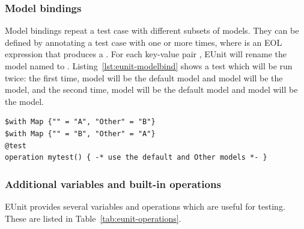 \subsubsection{Model bindings}

Model bindings repeat a test case with different subsets of models. They can be defined by annotating a test case with  one or more times, where  is an EOL expression that produces a . For each key-value pair , EUnit will rename the model named  to . Listing~\ref{lst:eunit-modelbind} shows a test which will be run twice: the first time, model  will be the default model and model  will be the  model, and the second time, model  will be the default model and model  will be the  model.

\begin{lstlisting}[float=tbp, language=EOL,caption=Example of a model binding,label=lst:eunit-modelbind,columns=fixed]
$with Map {"" = "A", "Other" = "B"}
$with Map {"" = "B", "Other" = "A"}
@test
operation mytest() { -* use the default and Other models *- }
\end{lstlisting}

\subsubsection{Additional variables and built-in operations}

EUnit provides several variables and operations which are useful for testing. These are listed in Table~\ref{tab:eunit-operations}.

